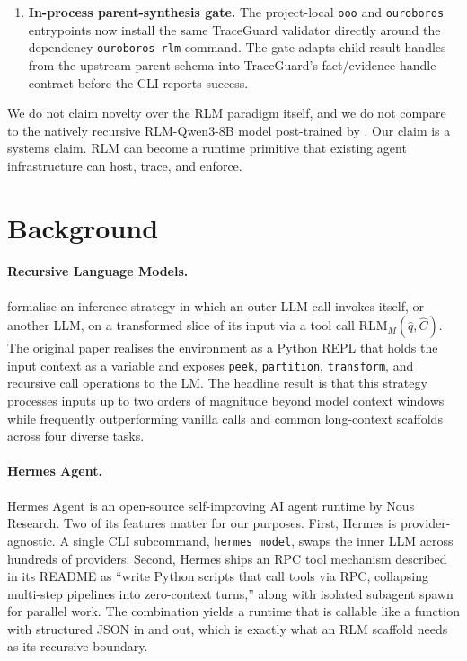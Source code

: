 \documentclass[11pt,a4paper]{article}
\begin{document}
\begin{enumerate}[leftmargin=*]
\item \textbf{In-process parent-synthesis gate.} The project-local
\texttt{ooo} and \texttt{ouroboros} entrypoints now install the same
TraceGuard validator directly around the dependency \texttt{ouroboros rlm}
command. The gate adapts child-result handles from the upstream parent schema
into TraceGuard's fact/evidence-handle contract before the CLI reports
success.
\end{enumerate}

We do not claim novelty over the RLM paradigm itself, and we do not compare
to the natively recursive RLM-Qwen3-8B model post-trained by
\citet{zhang2025rlm}. Our claim is a systems claim. RLM can become a runtime
primitive that existing agent infrastructure can host, trace, and enforce.

\section{Background}
\label{sec:bg}

\paragraph{Recursive Language Models.}
\citet{zhang2025rlm} formalise an inference strategy in which an outer
LLM call invokes itself, or another LLM, on a transformed slice of
its input via a tool call $\mathrm{RLM}_M(\hat{q}, \hat{C})$. The original
paper realises the environment as a Python REPL that holds the input
context as a variable and exposes \texttt{peek}, \texttt{partition},
\texttt{transform}, and recursive call operations to the LM. The headline
result is that this strategy processes inputs up to two orders of
magnitude beyond model context windows while frequently outperforming
vanilla calls and common long-context scaffolds across four diverse
tasks.

\paragraph{Hermes Agent.}
Hermes Agent is an open-source self-improving AI agent runtime by Nous
Research. Two of its features matter for our purposes. First, Hermes is
provider-agnostic. A single CLI subcommand, \texttt{hermes model}, swaps
the inner LLM across hundreds of providers. Second, Hermes ships
an RPC tool mechanism described in its README as ``write Python scripts
that call tools via RPC, collapsing multi-step pipelines into
zero-context turns,'' along with isolated subagent spawn for parallel
work. The combination yields a runtime that is callable like a function
with structured JSON in and out, which is exactly what an RLM scaffold
needs as its recursive boundary.
\end{document}
